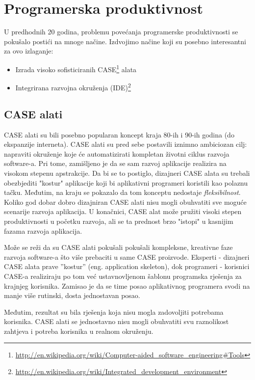 \documentclass[times, utf8, seminar]{fit}
\begin{document}
\section{Programerska produktivnost}

U predhodnih 20 godina, problemu povećanja programerske produktivnosti se pokušalo postići na mnoge načine. Izdvojimo načine koji su posebno interesantni za ovo izlaganje:

\begin{itemize}
  \item Izrada visoko sofisticiranih CASE\footnote{\url{http://en.wikipedia.org/wiki/Computer-aided_software_engineering#Tools}} alata
  \item Integrirana razvojna okruženja (IDE)\footnote{\url{http://en.wikipedia.org/wiki/Integrated_development_environment}} 
\end{itemize}

\subsection{CASE alati}

CASE alati su bili posebno popularan koncept kraja 80-ih i 90-ih godina (do ekspanzije interneta). CASE alati su pred sebe postavili iznimno ambiciozan cilj: napraviti okruženje koje će automatizirati kompletan životni ciklus razvoja software-a. Pri tome, zamišljeno je da se sam razvoj aplikacije realizira na visokom stepenu apstrakcije. Da bi se to postiglo, dizajneri CASE alata su trebali obezbjediti "kostur" aplikacije koji bi aplikativni programeri koristili kao polaznu tačku. Međutim, na kraju se pokazalo da tom konceptu nedostaje \emph{fleksibilnost}. Koliko god dobar dobro dizajniran CASE alati nisu mogli obuhvatiti sve moguće scenarije razvoja aplikacija. U konačnici, CASE alat može pružiti visoki stepen produktivnosti u početku razvoja, ali se ta prednost brzo "istopi" u kasnijim fazama razvoja aplikacija. 

Može se reži da su CASE alati pokušali pokušali kompleksne, kreativne faze razvoja software-a što više prebaciti u same CASE proizvode. Eksperti - dizajneri CASE alata prave ''kostur'' (eng. application skeleton), dok programeri - korisnici CASE-a realiziraju po tom već ustavnovljenom šablonu programska rješenja za krajnjeg korisnika. Zamisao je da se time posao aplikativnog programera svodi na manje više rutinski, dosta jednostavan posao.

Međutim, rezultat su bila rješenja koja nisu mogla zadovoljiti potrebama korisnika. CASE alati se jednostavno nisu mogli obuhvatiti svu raznolikost zahtjeva i potreba korisnika u realnom okruženju.
\end{document}
